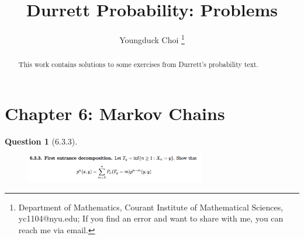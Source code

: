 \documentclass[11pt]{article}
\date{}
\title{\vspace{-0.7cm}
Durrett Probability: Problems}
\author{
Youngduck Choi 
\thanks{Department of Mathematics, Courant Institute of Mathematical Sciences, 
yc1104@nyu.edu; If you find an error and want to share with me, 
you can reach me via email.
}}
\theoremstyle{plain}
\theoremstyle{quest}
\newtheorem*{question}{Question}
\begin{document}
\maketitle

\begin{abstract}
This work contains solutions to some
exercises from Durrett's probability
text.
\end{abstract}


\section{Chapter 6: Markov Chains} \label{sec:MC}

\begin{question}[6.3.3]
\hfill
\begin{figure}[h!]
  \centering
    \includegraphics[width=0.7\textwidth]{d-6-3-3.png}
\end{figure}
\end{question}
\end{document}
